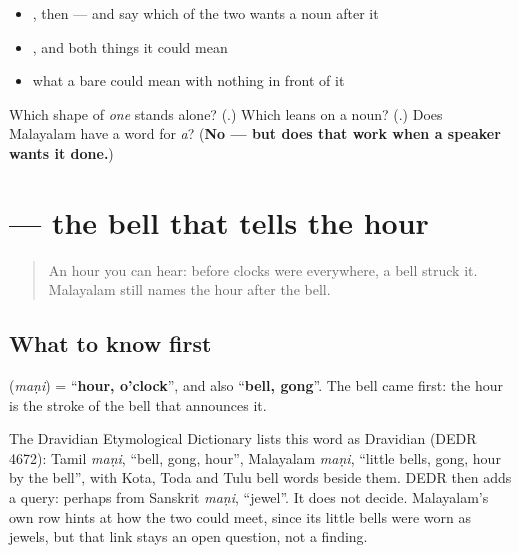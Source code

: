 \begin{itemize}
\raggedright
  \item \textbf{}, then \textbf{} — and say which of the two wants a noun after it
  \item \textbf{ }, and both things it could mean
  \item what a bare \textbf{} could mean with nothing in front of it
\end{itemize}

\begin{tcolorbox}[breakable,colback=teal!4,colframe=teal!35!black,title={Before you move on}]
Which shape of \emph{one} stands alone? (\textbf{}.) Which leans on a noun? (\textbf{}.) Does Malayalam have a word for \emph{a}? (\textbf{No — but  does that work when a speaker wants it done.})
\end{tcolorbox}
\section[\texorpdfstring{\ml{മണി} (maṇi)}{മണി (maṇi)}]{ — the bell that tells the hour}

\label{lesson:ML-C18-mani}



\begin{quote}
An hour you can hear: before clocks were everywhere, a bell struck it. Malayalam still names the hour after the bell.
\end{quote}

\subsection*{What to know first}
\textbf{} (\emph{maṇi}) = \textquotedblleft{}\textbf{hour, o'clock}\textquotedblright{}, and also \textquotedblleft{}\textbf{bell, gong}\textquotedblright{}. The bell came first: the hour is the stroke of the bell that announces it.

\begin{culture}
The Dravidian Etymological Dictionary lists this word as Dravidian (DEDR 4672): Tamil \emph{maṇi}, \textquotedblleft{}bell, gong, hour\textquotedblright{}, Malayalam \emph{maṇi}, \textquotedblleft{}little bells, gong, hour by the bell\textquotedblright{}, with Kota, Toda and Tulu bell words beside them. DEDR then adds a query: perhaps from Sanskrit \emph{maṇi}, \textquotedblleft{}jewel\textquotedblright{}. It does not decide. Malayalam's own row hints at how the two could meet, since its little bells were worn as jewels, but that link stays an open question, not a finding.
\end{culture}


